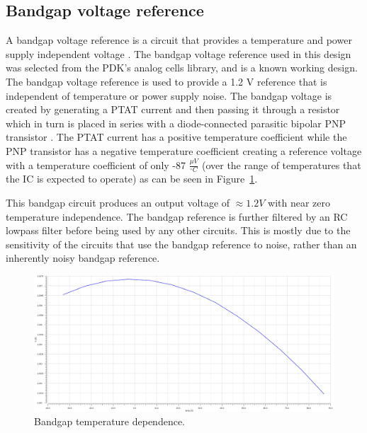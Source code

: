 \documentclass[12pt,oneside,final]{siuethesis}
\theoremstyle{definition}
\begin{document}
\subsection{Bandgap voltage reference}
\par A bandgap voltage reference is a circuit that provides a temperature and power supply independent voltage \cite{ALLEN}. The bandgap voltage reference used in this design was selected from the PDK's analog cells library, and is a known working design. The bandgap voltage reference is used to provide a 1.2 V reference  that is independent of temperature or power supply noise. The bandgap voltage is created by generating a PTAT current and then passing it through a resistor which in turn is placed in series with a diode-connected parasitic bipolar PNP transistor \cite{ALLEN}. The PTAT current has a positive temperature coefficient while the PNP transistor has a negative temperature coefficient creating a reference voltage with a temperature coefficient of only -87 $\frac{\mu V}{^{\circ}C}$ (over the range of temperatures that the IC is expected to operate) as can be seen in Figure~\ref{fig:bandgap}.
\par This bandgap circuit produces an output voltage of $\approx 1.2 V$ with near zero temperature independence. The bandgap reference is further filtered by an RC lowpass filter before being used by any other circuits. This is mostly due to the sensitivity of the circuits that use the bandgap reference to noise, rather than an inherently noisy bandgap reference.

\begin{figure}[htbp!]
\centering
\includegraphics[scale=.4,keepaspectratio=true, angle=90]{../data/bandgap_temp.png} 
\caption{Bandgap temperature dependence.}
\label{fig:bandgap}
\end{figure}
\end{document}
